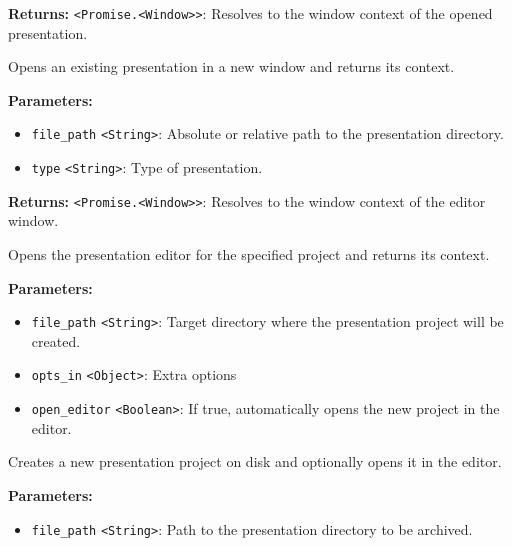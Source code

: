 \documentclass[12pt,a4paper]{article}
\begin{document}
\noindent \textbf{Returns:} \texttt{<Promise.<Window>>}: Resolves to the window context of the opened presentation.

\noindent Opens an existing presentation in a new window and returns its context.

\vspace{5mm}
\noindent {}


\noindent \textbf{Parameters:}
\begin{itemize}
  \item \texttt{file\_path} \texttt{<String>}: Absolute or relative path to the presentation directory.
  \item \texttt{type} \texttt{<String>}: Type of presentation.
\end{itemize}

\noindent \textbf{Returns:} \texttt{<Promise.<Window>>}: Resolves to the window context of the editor window.

\noindent Opens the presentation editor for the specified project and returns its context.

\vspace{5mm}
\noindent {}


\noindent \textbf{Parameters:}
\begin{itemize}
  \item \texttt{file\_path} \texttt{<String>}: Target directory where the presentation project will be created.
  \item \texttt{opts\_in} \texttt{<Object>}: Extra options
  \item \texttt{open\_editor} \texttt{<Boolean>}: If true, automatically opens the new project in the editor.
\end{itemize}

\noindent Creates a new presentation project on disk and optionally opens it in the editor.

\vspace{5mm}
\noindent {}


\noindent \textbf{Parameters:}
\begin{itemize}
  \item \texttt{file\_path} \texttt{<String>}: Path to the presentation directory to be archived.
\end{itemize}
\end{document}
